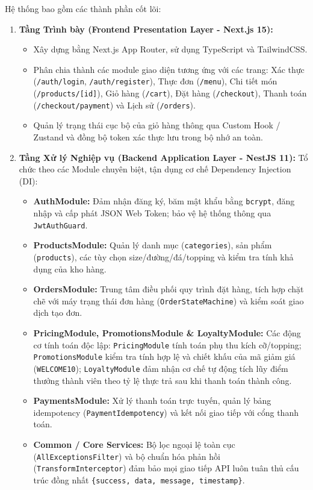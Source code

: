Hệ thống bao gồm các thành phần cốt lõi:
\begin{enumerate}
    \item \textbf{Tầng Trình bày (Frontend Presentation Layer - Next.js 15):}
    \begin{itemize}
        \item Xây dựng bằng Next.js App Router, sử dụng TypeScript và TailwindCSS.
        \item Phân chia thành các module giao diện tương ứng với các trang: Xác thực (\texttt{/auth/login}, \texttt{/auth/register}), Thực đơn (\texttt{/menu}), Chi tiết món (\texttt{/products/[id]}), Giỏ hàng (\texttt{/cart}), Đặt hàng (\texttt{/checkout}), Thanh toán (\texttt{/checkout/payment}) và Lịch sử (\texttt{/orders}).
        \item Quản lý trạng thái cục bộ của giỏ hàng thông qua Custom Hook / Zustand và đồng bộ token xác thực lưu trong bộ nhớ an toàn.
    \end{itemize}
    \item \textbf{Tầng Xử lý Nghiệp vụ (Backend Application Layer - NestJS 11):}
    Tổ chức theo các Module chuyên biệt, tận dụng cơ chế Dependency Injection (DI):
    \begin{itemize}
        \item \textbf{AuthModule:} Đảm nhận đăng ký, băm mật khẩu bằng \texttt{bcrypt}, đăng nhập và cấp phát JSON Web Token; bảo vệ hệ thống thông qua \texttt{JwtAuthGuard}.
        \item \textbf{ProductsModule:} Quản lý danh mục (\texttt{categories}), sản phẩm (\texttt{products}), các tùy chọn size/đường/đá/topping và kiểm tra tính khả dụng của kho hàng.
        \item \textbf{OrdersModule:} Trung tâm điều phối quy trình đặt hàng, tích hợp chặt chẽ với máy trạng thái đơn hàng (\texttt{OrderStateMachine}) và kiểm soát giao dịch tạo đơn.
        \item \textbf{PricingModule, PromotionsModule \& LoyaltyModule:} Các động cơ tính toán độc lập: \texttt{PricingModule} tính toán phụ thu kích cỡ/topping; \texttt{PromotionsModule} kiểm tra tính hợp lệ và chiết khấu của mã giảm giá (\texttt{WELCOME10}); \texttt{LoyaltyModule} đảm nhận cơ chế tự động tích lũy điểm thưởng thành viên theo tỷ lệ thực trả sau khi thanh toán thành công.
        \item \textbf{PaymentsModule:} Xử lý thanh toán trực tuyến, quản lý bảng idempotency (\texttt{PaymentIdempotency}) và kết nối giao tiếp với cổng thanh toán.
        \item \textbf{Common / Core Services:} Bộ lọc ngoại lệ toàn cục (\texttt{AllExceptionsFilter}) và bộ chuẩn hóa phản hồi (\texttt{TransformInterceptor}) đảm bảo mọi giao tiếp API luôn tuân thủ cấu trúc đồng nhất \texttt{\{success, data, message, timestamp\}}.

\end{itemize}
\end{enumerate}
